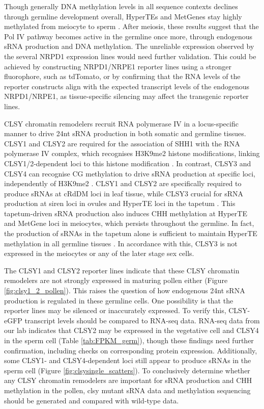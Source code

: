 Though generally DNA methylation levels in all sequence contexts declines through germline development overall, HyperTEs and MetGenes stay highly methylated from meiocyte to sperm \cite{RN17,RN199}. After meiosis, these results suggest that the Pol IV pathway becomes active in the germline once more, through endogenous sRNA production and DNA methylation.  The unreliable expression observed by the several NRPD1 expression lines would need further validation. This could be achieved by constructing NRPD1/NRPE1 reporter lines using a stronger fluorophore, such as tdTomato, or by confirming that the RNA levels of the reporter constructs align with the expected transcript levels of the endogenous NRPD1/NRPE1, as tissue-specific silencing may affect the transgenic reporter lines.

CLSY chromatin remodelers recruit RNA polymerase IV in a locus-specific manner to drive 24nt sRNA production in both somatic and germline tissues. CLSY1 and CLSY2 are required for the association of SHH1 with the RNA polymerase IV complex, which recognises H3K9me2 histone modifications, linking CLSY1/2-dependent loci to this histone modification \cite{RN23}. In contrast, CLSY3 and CLSY4 can recognise CG methylation to drive sRNA production at specific loci, independently of H3K9me2 \cite{RN23}. CLSY1 and CLSY2 are specifically required to produce sRNAs at cRdDM loci in leaf tissue, while CLSY3 crucial for sRNA production at siren loci in ovules and HyperTE loci in the tapetum \cite{RN162,RN23,RN187}. This tapetum-driven sRNA production also induces CHH methylation at HyperTE and MetGene loci in meiocytes, which persists throughout the germline. In fact, the production of sRNAs in the tapetum alone is sufficient to maintain HyperTE methylation in all germline tissues \cite{RN187}. In accordance with this, CLSY3 is not expressed in the meiocytes or any of the later stage sex cells. 

The CLSY1 and CLSY2 reporter lines indicate that these CLSY chromatin remodelers are not strongly expressed in maturing pollen either (Figure \ref{fig:clsy1_2_pollen}). This raises the question of how endogenous 24nt sRNA production is regulated in these germline cells. One possibility is that the reporter lines may be silenced or inaccurately expressed. To verify this, CLSY-eGFP transcript levels should be compared to RNA-seq data. RNA-seq data from our lab indicates that CLSY2 may be expressed in the vegetative cell and CLSY4 in the sperm cell (Table \ref{tab:FPKM_germ}), though these findings need further confirmation, including checks on corresponding protein expression. Additionally, some CLSY1- and CLSY4-dependent loci still appear to produce sRNAs in the sperm cell (Figure \ref{fig:clsysingle_scatters}). To conclusively determine whether any CLSY chromatin remodelers are important for sRNA production and CHH methylation in the pollen, clsy mutant sRNA data and methylation sequencing should be generated and compared with wild-type data.

